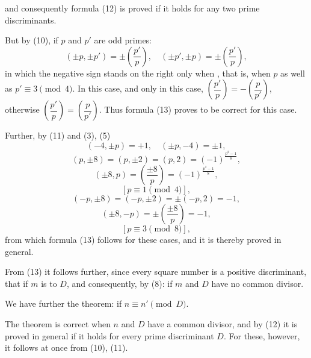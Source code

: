 and consequently formula (12) is proved if it holds for any two prime discriminants.

But by (10), if $p$ and $p'$ are odd primes:
\[
(\pm p, \pm p') = \pm\left(\frac{p'}{p}\right), \quad (\pm p', \pm p) = \pm\left(\frac{p'}{p}\right), %
\]
in which the negative sign stands on the right only when , that is, when $p$ as well as $p' \equiv 3 \pmod{4}$. In this case, and only in this case, $\left(\dfrac{p'}{p}\right) = -\left(\dfrac{p}{p'}\right)$, otherwise $\left(\dfrac{p'}{p}\right) = \left(\dfrac{p}{p'}\right)$. Thus formula (13) proves to be correct for this case.

Further, by (11) and (3), (5)
\[
(-4, \pm p) = +1, \quad (\pm p, -4) = \pm 1,
\]
\[
(p, \pm 8) = (p, \pm 2) = (p, 2) = (-1)^{\frac{p^2-1}{8}},
\]
\[
(\pm 8, p) = \left(\frac{\pm 8}{p}\right) = (-1)^{\frac{p^2-1}{8}},
\]
\[
[p \equiv 1 \pmod{4}],
\]
\[
(-p, \pm 8) = (-p, \pm 2) = \pm(-p, 2) = -1,
\]
\[
(\pm 8, -p) = \pm\left(\frac{\pm 8}{p}\right) = -1,
\]
\[
[p \equiv 3 \pmod{8}],
\]
from which formula (13) follows for these cases, and it is thereby proved in general.

From (13) it follows further, since every square number is a positive discriminant, that if $m$ is  to $D$,
and consequently, by (8):
if $m$ and $D$ have no common divisor.

We have further the theorem:
if $n \equiv n' \pmod{D}$.

The theorem is correct when $n$ and $D$ have a common divisor, and by (12) it is proved in general if it holds for every prime discriminant $D$. For these, however, it follows at once from (10), (11).
